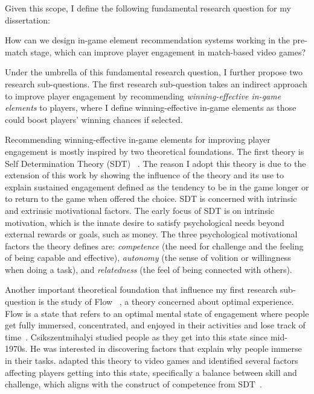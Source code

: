 Given this scope, I define the following fundamental research question for my dissertation:


\begin{displayquote}
How can we design in-game element recommendation systems working in the pre-match stage, which can improve player engagement in match-based video games?
\end{displayquote}


Under the umbrella of this fundamental research question, I further propose two research sub-questions. The first research sub-question takes an indirect approach to improve player engagement by recommending \textit{winning-effective in-game elements} to players, where I define winning-effective in-game elements as those could boost players' winning chances if selected. 

Recommending winning-effective in-game elements for improving player engagement is mostly inspired by two theoretical foundations. The first theory is Self Determination Theory (SDT) ~\citep{ryan2006motivational,przybylski2010motivational,yee2006motivations,wu2010falling,sherry2006video,lazzaro2004we,schoenau2011player}. The reason I adopt this theory is due to the extension of this work by \citep{przybylski2010motivational,ryan2006motivational} showing the influence of the theory and its use to explain sustained engagement defined as the tendency to be in the game longer or to return to the game when offered the choice. SDT is concerned with intrinsic and extrinsic motivational factors. The early focus of SDT is on intrinsic motivation, which is the innate desire to satisfy psychological needs beyond external rewards or goals, such as money. The three psychological motivational factors the theory defines are: \textit{competence} (the need for challenge and the feeling of being capable and effective), \textit{autonomy} (the sense of volition or willingness when doing a task), and \textit{relatedness} (the feel of being connected with others). 

Another important theoretical foundation that influence my first research sub-question is the study of Flow ~\citep{flow1990psychology}, a theory concerned about optimal experience. Flow is a state that refers to an optimal mental state of engagement where people get fully immersed, concentrated, and enjoyed in their activities and lose track of time~\citep{flow1990psychology}. Csikszentmihalyi studied people as they get into this state since mid-1970s. He was interested in discovering factors that explain why people immerse in their tasks. \textcite{sweetser2005gameflow} adapted this theory to video games and identified several factors affecting players getting into this state, specifically a balance between skill and challenge, which aligns with the construct of competence from SDT~\citep{ryan2000self}. 


